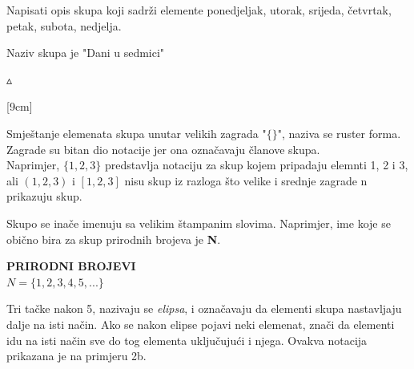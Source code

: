 \documentclass[a4paper,14pt,svgnames]{article}
\newcounter{counter}
\newcommand{\examplecounter}{\textbf{\refstepcounter{counter}PRIMJER \thecounter}}
\newcommand{\example}[3]{\begin{tcolorbox}[title=\large \examplecounter \hfill\small\textbf{"#1"}]
#2
\begin{tcolorbox}[title=\small \textbf{RJEŠENJE},colback=white]
\begin{center}
#3

\vspace{0.5em}\hfill $\vartriangle$
\end{center}
\end{tcolorbox}
\end{tcolorbox}}
\begin{document}
\example{Opis skupova}{Napisati opis skupa koji sadrži elemente ponedjeljak, utorak, srijeda, četvrtak, petak, subota, nedjelja.}{Naziv skupa je "Dani u sedmici"}\medskip

\reversemarginpar
\color{white}
[9cm]
\color{black}

Smještanje elemenata skupa unutar velikih zagrada "$\{ \}$", naziva se ruster forma. Zagrade su bitan dio notacije jer ona označavaju članove skupa.\\
Naprimjer, $\{1, 2, 3\}$ predstavlja notaciju za skup kojem pripadaju elemnti 1, 2 i 3, ali $(1, 2, 3)$ i $[1, 2, 3]$ nisu skup iz razloga što velike i srednje zagrade n prikazuju skup.\medskip

Skupo se inače imenuju sa velikim štampanim slovima. Naprimjer, ime koje se obično bira za skup prirodnih brojeva je \textbf{N}.\\
\begin{tcolorbox}
\begin{center}
\textbf{\textsc{PRIRODNI BROJEVI}}\\
$N = \{1, 2, 3, 4, 5, ... \}$
\end{center}
\end{tcolorbox}\medskip

Tri tačke nakon 5, nazivaju se \textit{elipsa}, i označavaju da elementi skupa nastavljaju dalje na isti način. Ako se nakon elipse pojavi neki elemenat, znači da elementi idu na isti način sve do tog elementa uključujući i njega. Ovakva notacija prikazana je na primjeru 2b.\bigskip
\end{document}
